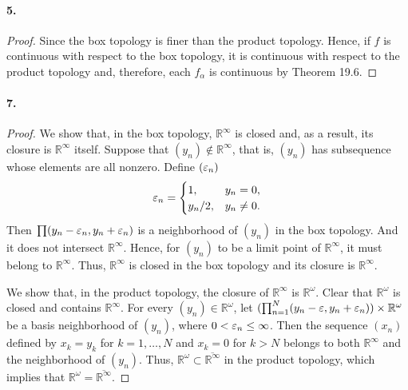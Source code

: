   \paragraph{5.}
  \begin{proof}
    Since the box topology is finer than the product topology. Hence, if $f$
    is continuous with respect to the box topology, it is continuous with 
    respect to the product topology and, therefore, each $f_\alpha$ is 
    continuous by Theorem 19.6.
  \end{proof}
  
  \paragraph{7.}
  \begin{proof}
    We show that, in the box topology, $\mathbb{R}^\infty$ is closed and, as a
    result, its closure is $\mathbb{R}^\infty$ itself. Suppose that $(y_n)
    \notin\mathbb{R}^\infty$, that is, $(y_n)$ has subsequence whose elements 
    are all nonzero. Define $(\varepsilon_n)$ 
    \[
      \varepsilon_n=\begin{cases}
        1, & y_n=0, \\
        y_n/2, & y_n\ne 0.
      \end{cases}
    \]
    Then $\prod(y_n-\varepsilon_n,y_n+\varepsilon_n)$ is a neighborhood of $(y_n)$ in the box
    topology. And it does not intersect $\mathbb{R}^\infty$. Hence, for $(y_n)$
    to be a limit point of $\mathbb{R}^\infty$, it must belong to $\mathbb{R}
    ^\infty$. Thus, $\mathbb{R}^\infty$ is closed in the box topology and 
    its closure is $\mathbb{R}^\infty$.\par
    We show that, in the product topology, the closure of $\mathbb{R}^\infty$
    is $\mathbb{R}^\omega$. Clear that $\mathbb{R}^\omega$ is closed and 
    contains $\mathbb{R}^\infty$. For every $(y_n)\in\mathbb{R}^\omega$, let 
    $(\prod_{n=1}^N(y_n-\varepsilon,y_n+\varepsilon_n))\times\mathbb{R}^\omega$ be a basis 
    neighborhood of $(y_n)$, where $0<\varepsilon_n\le\infty$. Then the sequence 
    $(x_n)$ defined by $x_k=y_k$ for $k=1,\dots,N$ and $x_k=0$ for $k>N$ 
    belongs to both $\mathbb{R}^\infty$ and the neighborhood of $(y_n)$. Thus, 
    $\mathbb{R}^\omega\subset \overline{\mathbb{R}^\infty}$ in the product 
    topology, which implies that $\mathbb{R}^\omega=\overline{\mathbb{R}
    ^\infty}$.
  \end{proof}
  
